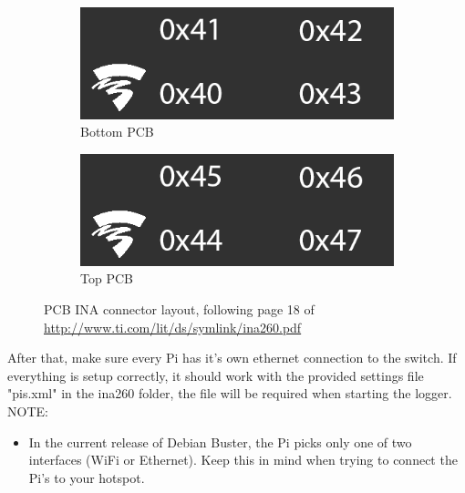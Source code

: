 \documentclass[a4paper, 12pt, one column, aas_macros]{article}
\begin{document}
\begin{figure}[h]
	\centering
	\begin{subfigure}[b]{0.4\linewidth}
    		\includegraphics[width=\linewidth]{pcb-ina-0.png}
    		\caption{Bottom PCB}
    	\end{subfigure}
    \begin{subfigure}[b]{0.4\linewidth}
    		\includegraphics[width=\linewidth]{pcb-ina-1.png}
    		\caption{Top PCB}
    \end{subfigure}
    \caption{PCB INA connector layout, following page 18 of \url{http://www.ti.com/lit/ds/symlink/ina260.pdf}}
    \label{inapcb}
\end{figure}\newline
After that, make sure every Pi has it's own ethernet connection to the switch. If everything is setup correctly, it should work with the provided settings file "pis.xml" in the ina260 folder, the file will be required when starting the logger.\newline
\newline
NOTE:
\begin{itemize}
	\item In the current release of Debian Buster, the Pi picks only one of two interfaces (WiFi or Ethernet). Keep this in mind when trying to connect the Pi's to your hotspot.
\end{itemize}
\end{document}
